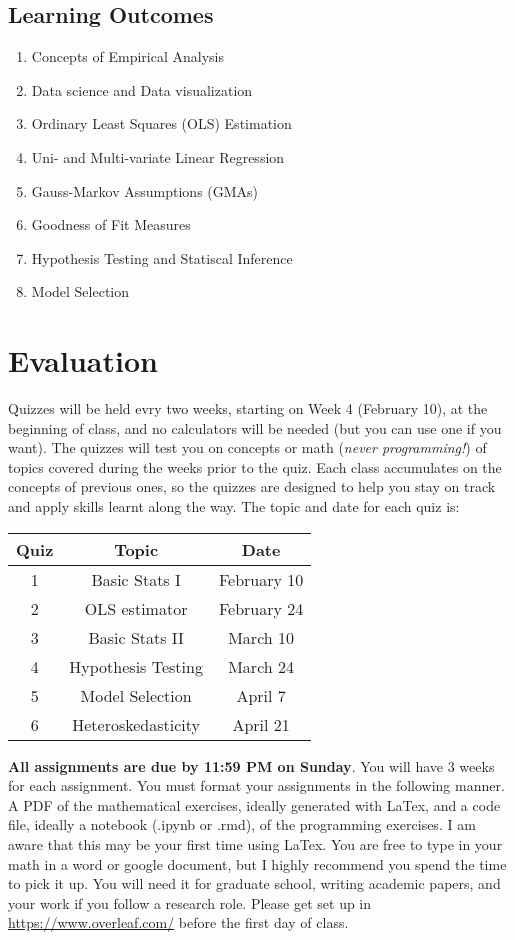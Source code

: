 \documentclass[10pt]{article}
\begin{document}
\subsection*{Learning Outcomes}
\begin{enumerate}
  \item Concepts of Empirical Analysis
  \item Data science and Data visualization
  \item Ordinary Least Squares (OLS) Estimation
  \item Uni- and Multi-variate Linear Regression
  \item Gauss-Markov Assumptions (GMAs)
  \item Goodness of Fit Measures
  \item Hypothesis Testing and Statiscal Inference 
  \item Model Selection
\end{enumerate}

\section*{Evaluation}
Quizzes will be held evry two weeks, starting on Week 4 (February 10), at the beginning of class, and no calculators will be needed (but you can use one if you want). The quizzes will test you on concepts or math (\textit{never programming!}) of topics covered during the weeks prior to the quiz. Each class accumulates on the concepts of previous ones, so the quizzes are designed to help you stay on track and apply skills learnt along the way. The topic and date for each quiz is:

\vspace{1em}
\noindent
\begin{center}
    \begin{tabular}{c|c|c}
        Quiz & Topic & Date \\
        \hline 
        1 & Basic Stats I & February 10 \\
        2 & OLS estimator & February 24 \\
        3 & Basic Stats II & March 10 \\
        4 & Hypothesis Testing & March 24 \\
        5 & Model Selection & April 7 \\
        6 & Heteroskedasticity & April 21
    \end{tabular}
\end{center}

\vspace{1em}
\noindent
\textbf{All assignments are due by 11:59 PM on Sunday}. You will have 3 weeks for each assignment. You must format your assignments in the following manner. A PDF of the mathematical exercises, ideally generated with LaTex, and a code file, ideally a notebook (.ipynb or .rmd), of the programming exercises. I am aware that this may be your first time using LaTex. You are free to type in your math in a word or google document, but I highly recommend you spend the time to pick it up. You will need it for graduate school, writing academic papers, and your work if you follow a research role. Please get set up in \href{Overleaf}{https://www.overleaf.com/} before the first day of class.
\end{document}

